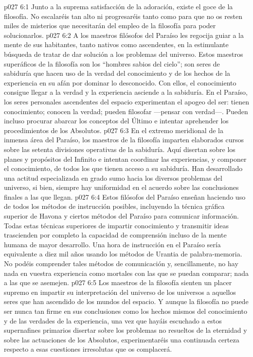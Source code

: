 \vs p027 6:1 Junto a la suprema satisfacción de la adoración, existe el goce de la filosofía. No escalaréis tan alto ni progresaréis tanto como para que no os resten miles de misterios que necesitarán del empleo de la filosofía para poder solucionarlos.
\vs p027 6:2 A los maestros filósofos del Paraíso les regocija guiar a la mente de sus habitantes, tanto nativos como ascendentes, en la estimulante búsqueda de tratar de dar solución a los problemas del universo. Estos maestros superáficos de la filosofía son los “hombres sabios del cielo”; son seres de sabiduría que hacen uso de la verdad del conocimiento y de los hechos de la experiencia en su afán por dominar lo desconocido. Con ellos, el conocimiento consigue llegar a la verdad y la experiencia asciende a la sabiduría. En el Paraíso, los seres personales ascendentes del espacio experimentan el apogeo del ser: tienen conocimiento; conocen la verdad; pueden filosofar ---pensar con verdad---. Pueden incluso procurar abarcar los conceptos del Último e intentar aprehender los procedimientos de los Absolutos.
\vs p027 6:3 En el extremo meridional de la inmensa área del Paraíso, los maestros de la filosofía imparten elaborados cursos sobre las setenta divisiones operativas de la sabiduría. Aquí disertan sobre los planes y propósitos del Infinito e intentan coordinar las experiencias, y componer el conocimiento, de todos los que tienen acceso a su sabiduría. Han desarrollado una actitud especializada en grado sumo hacia los diversos problemas del universo, si bien, siempre hay uniformidad en el acuerdo sobre las conclusiones finales a las que llegan.
\vs p027 6:4 Estos filósofos del Paraíso enseñan haciendo uso de todos los métodos de instrucción posibles, incluyendo la técnica gráfica superior de Havona y ciertos métodos del Paraíso para comunicar información. Todas estas técnicas superiores de impartir conocimiento y transmitir ideas trascienden por completo la capacidad de comprensión incluso de la mente humana de mayor desarrollo. Una hora de instrucción en el Paraíso sería equivalente a diez mil años usando los métodos de Urantia de palabra\hyp{}memoria. No podéis comprender tales métodos de comunicación y, sencillamente, no hay nada en vuestra experiencia como mortales con las que se puedan comparar; nada a las que se asemejen.
\vs p027 6:5 Los maestros de la filosofía sienten un placer supremo en impartir su interpretación del universo de los universos a aquellos seres que han ascendido de los mundos del espacio. Y aunque la filosofía no puede ser nunca tan firme en sus conclusiones como los hechos mismos del conocimiento y de las verdades de la experiencia, una vez que hayáis escuchado a estos supernafines primarios disertar sobre los problemas no resueltos de la eternidad y sobre las actuaciones de los Absolutos, experimentaréis una continuada certeza respecto a esas cuestiones irresolutas que os complacerá.
